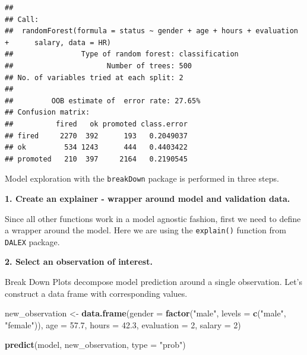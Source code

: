 \documentclass[]{book}
\newenvironment{Shaded}{\begin{snugshade}}{\end{snugshade}}
\newcommand{\ControlFlowTok}[1]{\textcolor[rgb]{0.13,0.29,0.53}{\textbf{#1}}}
\newcommand{\DataTypeTok}[1]{\textcolor[rgb]{0.13,0.29,0.53}{#1}}
\newcommand{\DecValTok}[1]{\textcolor[rgb]{0.00,0.00,0.81}{#1}}
\newcommand{\FloatTok}[1]{\textcolor[rgb]{0.00,0.00,0.81}{#1}}
\newcommand{\KeywordTok}[1]{\textcolor[rgb]{0.13,0.29,0.53}{\textbf{#1}}}
\newcommand{\NormalTok}[1]{#1}
\newcommand{\OperatorTok}[1]{\textcolor[rgb]{0.81,0.36,0.00}{\textbf{#1}}}
\newcommand{\StringTok}[1]{\textcolor[rgb]{0.31,0.60,0.02}{#1}}
\theoremstyle{definition}
\theoremstyle{definition}
\theoremstyle{definition}
\theoremstyle{remark}
\begin{document}
\begin{verbatim}
## 
## Call:
##  randomForest(formula = status ~ gender + age + hours + evaluation +      salary, data = HR) 
##                Type of random forest: classification
##                      Number of trees: 500
## No. of variables tried at each split: 2
## 
##         OOB estimate of  error rate: 27.65%
## Confusion matrix:
##          fired   ok promoted class.error
## fired     2270  392      193   0.2049037
## ok         534 1243      444   0.4403422
## promoted   210  397     2164   0.2190545
\end{verbatim}

Model exploration with the \texttt{breakDown} package is performed in
three steps.

\textbf{1. Create an explainer - wrapper around model and validation
data.}

Since all other functions work in a model agnostic fashion, first we
need to define a wrapper around the model. Here we are using the
\texttt{explain()} function from \texttt{DALEX} package.

\begin{Shaded}
\end{Shaded}

\textbf{2. Select an observation of interest.}

Break Down Plots decompose model prediction around a single observation.
Let's construct a data frame with corresponding values.

\begin{Shaded}
\begin{Highlighting}[]
\NormalTok{new_observation <-}\StringTok{ }\KeywordTok{data.frame}\NormalTok{(}\DataTypeTok{gender =} \KeywordTok{factor}\NormalTok{(}\StringTok{"male"}\NormalTok{, }\DataTypeTok{levels =} \KeywordTok{c}\NormalTok{(}\StringTok{"male"}\NormalTok{, }\StringTok{"female"}\NormalTok{)),}
                      \DataTypeTok{age =} \FloatTok{57.7}\NormalTok{,}
                      \DataTypeTok{hours =} \FloatTok{42.3}\NormalTok{,}
                      \DataTypeTok{evaluation =} \DecValTok{2}\NormalTok{,}
                      \DataTypeTok{salary =} \DecValTok{2}\NormalTok{)}

\KeywordTok{predict}\NormalTok{(model, new_observation, }\DataTypeTok{type =} \StringTok{"prob"}\NormalTok{)}
\end{Highlighting}
\end{Shaded}
\end{document}
